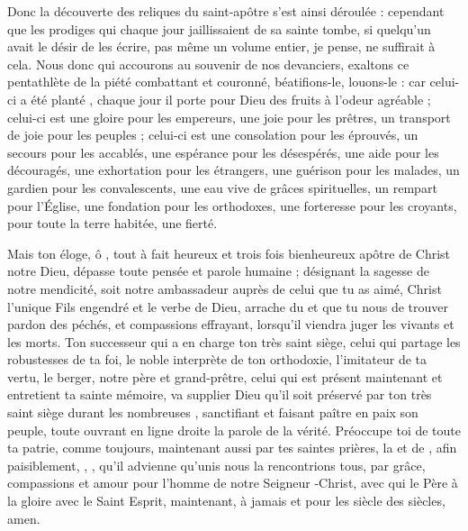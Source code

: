 \saut

Donc la découverte des reliques du saint-apôtre s'est ainsi déroulée :  
cependant que les prodiges qui chaque jour jaillissaient de sa sainte tombe,
si quelqu'un avait le désir de les écrire, pas même un volume entier, je pense, ne suffirait à cela. 
Nous donc qui accourons au souvenir de nos devanciers,  exaltons ce pentathlète de la piété combattant et couronné, béatifions-le, louons-le : 
car celui-ci a été planté , chaque jour il porte pour Dieu des fruits à l'odeur agréable ;
celui-ci est une gloire pour les empereurs, une joie pour les prêtres,  un transport de joie pour les peuples ;
celui-ci est une consolation pour les éprouvés, un secours pour les accablés,   une espérance pour les désespérés, une aide pour les découragés, une exhortation pour les étrangers, %
une guérison pour les malades, 
un gardien pour les convalescents, 
une eau vive de grâces spirituelles, %
un rempart pour l'Église,
une fondation pour les orthodoxes,
une forteresse pour les croyants,
pour toute la terre habitée, une fierté. %
 
Mais ton éloge,  ô , tout à fait heureux et trois fois bienheureux apôtre de Christ notre Dieu, dépasse toute pensée et parole humaine ;
désignant la sagesse de notre mendicité,  soit notre ambassadeur auprès de celui que tu as aimé, Christ l'unique Fils engendré et le verbe de Dieu,   arrache du  et que tu nous  de trouver pardon des péchés, et compassions  effrayant, lorsqu'il viendra juger les vivants et les morts. %
Ton successeur qui a en charge ton très saint siège, celui qui partage les robustesses de ta foi,
le noble interprète de  ton orthodoxie, l'imitateur de ta vertu, le berger, notre père et grand-prêtre, celui qui est présent maintenant et entretient ta sainte mémoire, 
va supplier Dieu qu'il soit préservé par ton très saint siège  durant les nombreuses , %
sanctifiant et faisant paître en paix son peuple,  toute  ouvrant en ligne droite la parole de la vérité.
Préoccupe toi de toute ta patrie, comme toujours, maintenant aussi par tes saintes prières, la  et de , 
afin  paisiblement, , ,
qu'il advienne qu'unis nous la  rencontrions tous, par
grâce, compassions et amour pour l'homme de notre Seigneur -Christ,
avec qui le Père à la gloire avec le Saint Esprit, maintenant, à jamais et pour les siècle des siècles, amen. 



